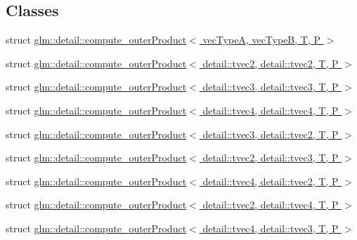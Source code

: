 \subsection*{Classes}
\begin{DoxyCompactItemize}
\item 
struct \hyperlink{structglm_1_1detail_1_1compute__outer_product}{glm\+::detail\+::compute\+\_\+outer\+Product$<$ vec\+Type\+A, vec\+Type\+B, T, P $>$}
\item 
struct \hyperlink{structglm_1_1detail_1_1compute__outer_product_3_01detail_1_1tvec2_00_01detail_1_1tvec2_00_01_t_00_01_p_01_4}{glm\+::detail\+::compute\+\_\+outer\+Product$<$ detail\+::tvec2, detail\+::tvec2, T, P $>$}
\item 
struct \hyperlink{structglm_1_1detail_1_1compute__outer_product_3_01detail_1_1tvec3_00_01detail_1_1tvec3_00_01_t_00_01_p_01_4}{glm\+::detail\+::compute\+\_\+outer\+Product$<$ detail\+::tvec3, detail\+::tvec3, T, P $>$}
\item 
struct \hyperlink{structglm_1_1detail_1_1compute__outer_product_3_01detail_1_1tvec4_00_01detail_1_1tvec4_00_01_t_00_01_p_01_4}{glm\+::detail\+::compute\+\_\+outer\+Product$<$ detail\+::tvec4, detail\+::tvec4, T, P $>$}
\item 
struct \hyperlink{structglm_1_1detail_1_1compute__outer_product_3_01detail_1_1tvec3_00_01detail_1_1tvec2_00_01_t_00_01_p_01_4}{glm\+::detail\+::compute\+\_\+outer\+Product$<$ detail\+::tvec3, detail\+::tvec2, T, P $>$}
\item 
struct \hyperlink{structglm_1_1detail_1_1compute__outer_product_3_01detail_1_1tvec2_00_01detail_1_1tvec3_00_01_t_00_01_p_01_4}{glm\+::detail\+::compute\+\_\+outer\+Product$<$ detail\+::tvec2, detail\+::tvec3, T, P $>$}
\item 
struct \hyperlink{structglm_1_1detail_1_1compute__outer_product_3_01detail_1_1tvec4_00_01detail_1_1tvec2_00_01_t_00_01_p_01_4}{glm\+::detail\+::compute\+\_\+outer\+Product$<$ detail\+::tvec4, detail\+::tvec2, T, P $>$}
\item 
struct \hyperlink{structglm_1_1detail_1_1compute__outer_product_3_01detail_1_1tvec2_00_01detail_1_1tvec4_00_01_t_00_01_p_01_4}{glm\+::detail\+::compute\+\_\+outer\+Product$<$ detail\+::tvec2, detail\+::tvec4, T, P $>$}
\item 
struct \hyperlink{structglm_1_1detail_1_1compute__outer_product_3_01detail_1_1tvec4_00_01detail_1_1tvec3_00_01_t_00_01_p_01_4}{glm\+::detail\+::compute\+\_\+outer\+Product$<$ detail\+::tvec4, detail\+::tvec3, T, P $>$}
\item 

\end{DoxyCompactItemize}
